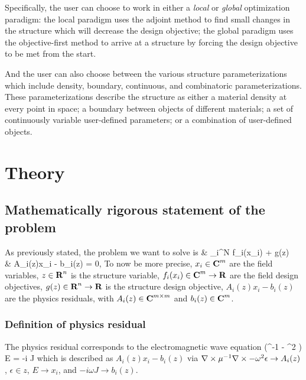 \documentclass{book}
\newcommand{\reals}{{\mbox{\bf R}}}
\newcommand{\comps}{{\mbox{\bf C}}}
\begin{document}
Specifically, the user can choose to work in either
    a \emph{local} or \emph{global} optimization paradigm:
    \BI the local paradigm uses the adjoint method
            to find small changes in the structure which
            will decrease the design objective;
    \I  the global paradigm uses the objective-first method
            to arrive at a structure by forcing
            the design objective to be met from the start. \EI

And the user can also choose between the various structure parameterizations 
    which include density, boundary, 
    continuous, and combinatoric parameterizations.
These parameterizations describe the structure as either
    \BI a material density at every point in space;
    \I  a boundary between objects of different materials;
    \I  a set of continuously variable user-defined parameters; or 
    \I  a combination of user-defined objects. \EI

\chapter{Theory}
\section{Mathematically rigorous statement of the problem}
As previously stated, the problem we want to solve is 
        {\minimize&  \sum_i^N f_i(x_i) + g(z) \\
        \subto&     A_i(z)x_i - b_i(z) = 0,\quad{}}
To now be more precise,
    \BI $x_i \in \comps^m$ are the field variables,
    \I  $z \in \reals^n$ is the structure variable,
    \I  $f_i(x_i) \in \comps^m \to \reals$ are the field design objectives,
    \I  $g(z) \in \reals^n \to \reals$ is the structure design objective,
    \I  $A_i(z)x_i - b_i(z)$ are the physics residuals, with
    \I  $A_i(z) \in \comps^{m \times m}$ and
    \I  $b_i(z) \in \comps^m$. \EI

\subsection{Definition of physics residual}
The physics residual corresponds to the electromagnetic wave equation
        {(\curl \mu^{-1} \curl - \omega^2 \epsilon) E = -i \omega J}
    which is described as $A_i(z)x_i - b_i(z)$ via
    \BI $\nabla\times \mu^{-1} \nabla\times - \omega^2 \epsilon \to A_i(z)$,
    \I  $\epsilon \in z$,
    \I  $E \to x_i$, and
    \I  $-i \omega J \to b_i(z)$. \EI
\end{document}
